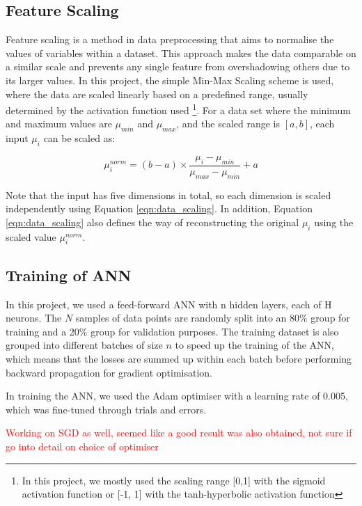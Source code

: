 \subsection{Feature Scaling}
Feature scaling is a method in data preprocessing that aims to normalise the values of variables within a dataset. This approach makes the data comparable on a similar scale and prevents any single feature from overshadowing others due to its larger values. In this project, the simple Min-Max Scaling scheme is used, where the data are scaled linearly based on a predefined range, usually determined by the activation function used \footnote{In this project, we mostly used the scaling range [0,1] with the sigmoid activation function or [-1, 1] with the tanh-hyperbolic activation function}. For a data set where the minimum and maximum values are $\mu_{min}$ and $\mu_{max}$, and the scaled range is $[a, b]$, each input $\mu_i$ can be scaled as:

\begin{equation}
    \mu^{norm}_i = \left( b - a \right) \times \frac{\mu_i - \mu_{min}}{\mu_{max} - \mu_{min}} + a
    \label{eqn:data_scaling}
\end{equation}

Note that the input has five dimensions in total, so each dimension is scaled independently using Equation \ref{eqn:data_scaling}. In addition, Equation \ref{eqn:data_scaling} also defines the way of reconstructing the original $\mu_i$ using the scaled value $\mu^{norm}_i $.

\subsection{Training of ANN}
In this project, we used a feed-forward ANN with n hidden layers, each of H neurons.  The $N$ samples of data points are randomly split into an 80\% group for training and a 20\% group for validation purposes. The training dataset is also grouped into different batches of size $n$ to speed up the training of the ANN, which means that the losses are summed up within each batch before performing backward propagation for gradient optimisation.  

In training the ANN, we used the Adam optimiser with a learning rate of 0.005, which was fine-tuned through trials and errors. 

\textcolor{red}{Working on SGD as well, seemed like a good result was also obtained, not sure if go into detail on choice of optimiser }

